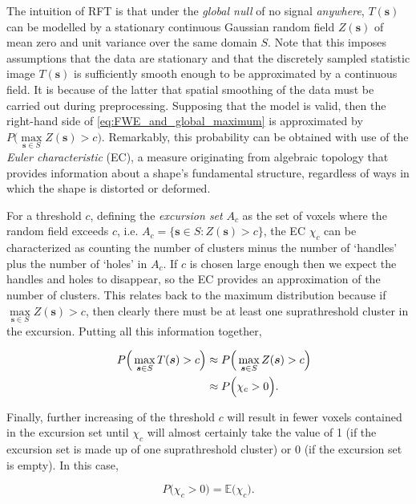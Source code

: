 The intuition of RFT is that under the \textit{global null} of no signal \textit{anywhere}, $T(\bm{s})$ can be modelled by a stationary continuous Gaussian random field $Z(\bm{s})$ of mean zero and unit variance over the same domain $S$. Note that this imposes assumptions that the data are stationary and that the discretely sampled statistic image $T(\bm{s})$ is sufficiently smooth enough to be approximated by a continuous field. It is because of the latter that spatial smoothing of the data must be carried out during preprocessing.  Supposing that the model is valid, then the right-hand side of \ref{eq:FWE_and_global_maximum} is approximated by $P\Big(\max\limits_{\bm{s} \in S} Z(\bm{s}) > c \Big)$. Remarkably, this probability can be obtained with use of the \textit{Euler characteristic} (EC), a measure originating from algebraic topology that provides information about a shape's fundamental structure, regardless of ways in which the shape is distorted or deformed. 

For a threshold $c$, defining the \textit{excursion set} $A_{c}$ as the set of voxels where the random field exceeds $c$, i.e. $A_{c} = \Big\{ \bm{s} \in S : Z(\bm{s}) > c \Big\}$, the EC $\chi_{c}$ can be characterized as counting the number of clusters minus the number of `handles' plus the number of `holes' in $A_c$. If $c$ is chosen large enough then we expect the handles and holes to disappear, so the EC provides an approximation of the number of clusters. This relates back to the maximum distribution because if $\max\limits_{\bm{s} \in S} Z(\bm{s}) > c$, then clearly there must be at least one suprathreshold cluster in the excursion. Putting all this information together,

\begin{alignat}{4}
\label{eq:prob_EC}
&&P\Big(\max\limits_{\bm{s} \in S} T(\bm{s}) > c \Big)
&\approx P\Big(\max\limits_{\bm{s} \in S} Z(\bm{s}) > c \Big) \notag\\
&
&
&\approx P\Big(\chi_{c} > 0\Big).
\end{alignat}

Finally, further increasing of the threshold $c$ will result in fewer voxels contained in the excursion set until $\chi_{c}$ will almost certainly take the value of 1 (if the excursion set is made up of one suprathreshold cluster) or 0 (if the excursion set is empty). In this case,

\begin{equation}
\label{eq:EC_high_threshold}
P\Big(\chi_{c} > 0\Big) = \mathbb{E}\Big(\chi_{c} \Big).
\end{equation}

